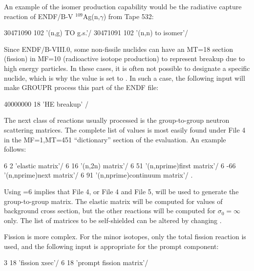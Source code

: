 \noindent
An example of the isomer production capability would be the
radiative capture reaction of ENDF/B-V $^{109}$Ag(n,$\gamma$)
from Tape 532:

\small
\begin{ccode}

   30471090 102 '(n,g) TO g.s.'/
   30471091 102 '(n,n) to isomer'/

\end{ccode}
\normalsize

\noindent
Since ENDF/B-VIII.0, some non-fissile nuclides can have an MT=18 section (fission)
in MF=10 (radioactive isotope production) to represent breakup due to high energy
particles. In these cases, it is often not possible to designate a specific nuclide,
which is why the  value is set to . In such a case, the
following input will make GROUPR process this part of the ENDF file:

\small
\begin{ccode}

   40000000  18 'HE breakup' /

\end{ccode}
\normalsize

The next class of reactions usually processed is the group-to-group
neutron scattering matrices.  The complete list of  values is
most easily found under File 4 in the MF=1,MT=451 ``dictionary''
section of the evaluation.  An example follows:

\small
\begin{ccode}

   6   2 'elastic matrix'/
   6  16 '(n,2n) matrix'/
   6  51 '(n,nprime)first matrix'/
   6 -66 '(n,nprime)next matrix'/
   6  91 '(n,nprime)continuum matrix'/  .

\end{ccode}
\normalsize

\noindent
Using =6 implies that File 4, or File 4 and File 5, will
be used to generate the group-to-group matrix.  The elastic matrix will
be computed for  values of background cross section, but
the other reactions will be computed for $\sigma_0{=}\infty$ only.  The
list of matrices to be self-shielded can be altered by changing
.

Fission is more complex.  For the minor isotopes, only
the total fission reaction is used, and the following input is appropriate
for the prompt component:

\small
\begin{ccode}

   3 18 'fission xsec'/
   6 18 'prompt fission matrix'/

\end{ccode}
\normalsize

